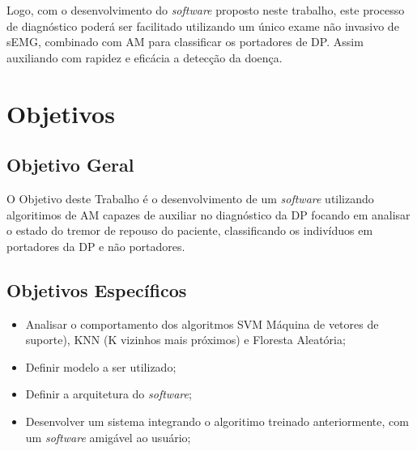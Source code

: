 Logo, com o desenvolvimento do \textit{software} proposto neste trabalho, este processo de diagnóstico poderá ser facilitado utilizando um único exame não invasivo de sEMG, combinado com AM para classificar os portadores de DP. Assim auxiliando com rapidez e eficácia a detecção da doença. 

\section{Objetivos} 
\subsection{Objetivo Geral} 
O Objetivo deste Trabalho é o desenvolvimento de um \textit{software} utilizando algoritimos de AM capazes de auxiliar no diagnóstico da DP focando em analisar o estado do tremor de repouso do paciente, classificando os indivíduos em portadores da DP e não portadores. 

\subsection{Objetivos Específicos}
\begin{itemize}
    \item Analisar o comportamento dos algoritmos SVM Máquina de vetores de suporte), KNN (K vizinhos mais próximos) e Floresta Aleatória;
    \item Definir modelo a ser utilizado;
    \item Definir a arquitetura do \textit{software};
    \item Desenvolver um sistema integrando o algoritimo treinado anteriormente, com um \textit{software} amigável ao usuário;
\end{itemize}